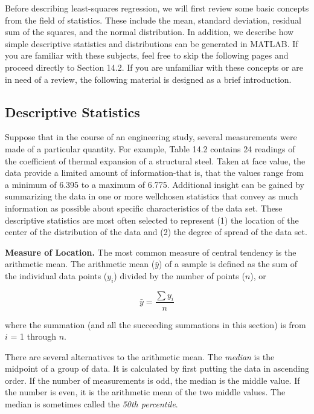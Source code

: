 \documentclass[../main.tex]{subfiles}
\begin{document}
\noindent Before describing least-squares regression, we will first review some basic concepts
from the field of statistics. These include the mean, standard deviation, residual sum of
the squares, and the normal distribution. In addition, we describe how simple descriptive
statistics and distributions can be generated in MATLAB. If you are familiar with these
subjects, feel free to skip the following pages and proceed directly to Section 14.2. If you
are unfamiliar with these concepts or are in need of a review, the following material is
designed as a brief introduction.

\label{cha:cha_P_14_1_1}
\subsection{Descriptive Statistics}

\noindent Suppose that in the course of an engineering study, several measurements were made of a
particular quantity. For example, Table 14.2 contains 24 readings of the coefficient of thermal expansion of a structural steel. Taken at face value, the data provide a limited amount
of information-that is, that the values range from a minimum of 6.395 to a maximum of
6.775. Additional insight can be gained by summarizing the data in one or more wellchosen statistics that convey as much information as possible about specific characteristics of
the data set. These descriptive statistics are most often selected to represent (1) the location
of the center of the distribution of the data and (2) the degree of spread of the data set.

\noindent \textbf{Measure of Location.} \quad The most common measure of central tendency is the arithmetic
mean. The arithmetic mean ($\bar{y}$) of a sample is defined as the sum of the individual data
points ($y_i$) divided by the number of points ($n$), or

\begin{equation}
	\tag{14.2}
	\bar{y} = \frac{\sum y_i}{n}
\end{equation}

where the summation (and all the succeeding summations in this section) is from $i$ = 1
through $n$.

There are several alternatives to the arithmetic mean. The \textit{median} is the midpoint of a
group of data. It is calculated by first putting the data in ascending order. If the number of
measurements is odd, the median is the middle value. If the number is even, it is the arithmetic mean of the two middle values. The median is sometimes called the \textit{50th percentile}.
\end{document}
